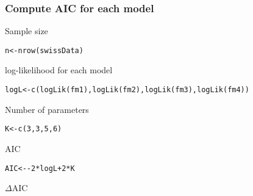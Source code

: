 \documentclass[color=usenames,dvipsnames]{beamer}\usepackage[]{graphicx}\usepackage[]{color}
\makeatletter
\newcommand{\hlnum}[1]{\textcolor[rgb]{0.69,0.494,0}{#1}}%
\newcommand{\hlopt}[1]{\textcolor[rgb]{0,0,0}{#1}}%
\newcommand{\hlstd}[1]{\textcolor[rgb]{0,0,0}{#1}}%
\newcommand{\hlkwb}[1]{\textcolor[rgb]{0,0.341,0.682}{#1}}%
\newcommand{\hlkwd}[1]{\textcolor[rgb]{0.004,0.004,0.506}{#1}}%
\newenvironment{kframe}{%
 \def\at@end@of@kframe{}%
 \ifinner\ifhmode%
  \def\at@end@of@kframe{\end{minipage}}%
  \begin{minipage}{\columnwidth}%
 \fi\fi%
 \def\FrameCommand##1{\hskip\@totalleftmargin \hskip-\fboxsep
 \colorbox{shadecolor}{##1}\hskip-\fboxsep
     \hskip-\linewidth \hskip-\@totalleftmargin \hskip\columnwidth}%
 \MakeFramed {\advance\hsize-\width
   \@totalleftmargin\z@ \linewidth\hsize
   \@setminipage}}%
 {\par\unskip\endMakeFramed%
 \at@end@of@kframe}
\newenvironment{knitrout}{}{} %
\makeatother
\begin{document}
\begin{frame}[fragile]
  \frametitle{Compute AIC for each model}
  {Sample size}
  \small
\begin{knitrout}\footnotesize
{}\color{fgcolor}\begin{kframe}
\begin{alltt}
\hlstd{n} \hlkwb{<-} \hlkwd{nrow}\hlstd{(swissData)}
\end{alltt}
\end{kframe}
\end{knitrout}
\pause
\vfill
{log-likelihood for each model}
\begin{knitrout}\footnotesize
{}\color{fgcolor}\begin{kframe}
\begin{alltt}
\hlstd{logL} \hlkwb{<-} \hlkwd{c}\hlstd{(}\hlkwd{logLik}\hlstd{(fm1),} \hlkwd{logLik}\hlstd{(fm2),} \hlkwd{logLik}\hlstd{(fm3),} \hlkwd{logLik}\hlstd{(fm4))}
\end{alltt}
\end{kframe}
\end{knitrout}
\pause
\vfill
{Number of parameters}
\begin{knitrout}\footnotesize
{}\color{fgcolor}\begin{kframe}
\begin{alltt}
\hlstd{K} \hlkwb{<-} \hlkwd{c}\hlstd{(}\hlnum{3}\hlstd{,} \hlnum{3}\hlstd{,} \hlnum{5}\hlstd{,} \hlnum{6}\hlstd{)}
\end{alltt}
\end{kframe}
\end{knitrout}
\pause
\vfill
{AIC}
\begin{knitrout}\footnotesize
{}\color{fgcolor}\begin{kframe}
\begin{alltt}
\hlstd{AIC} \hlkwb{<-} \hlopt{-}\hlnum{2}\hlopt{*}\hlstd{logL} \hlopt{+} \hlnum{2}\hlopt{*}\hlstd{K}
\end{alltt}
\end{kframe}
\end{knitrout}
\pause
\vfill
  {$\Delta$AIC}
\begin{knitrout}\footnotesize
{}\color{fgcolor}\begin{kframe}

\end{kframe}
\end{knitrout}
\end{frame}
\end{document}
